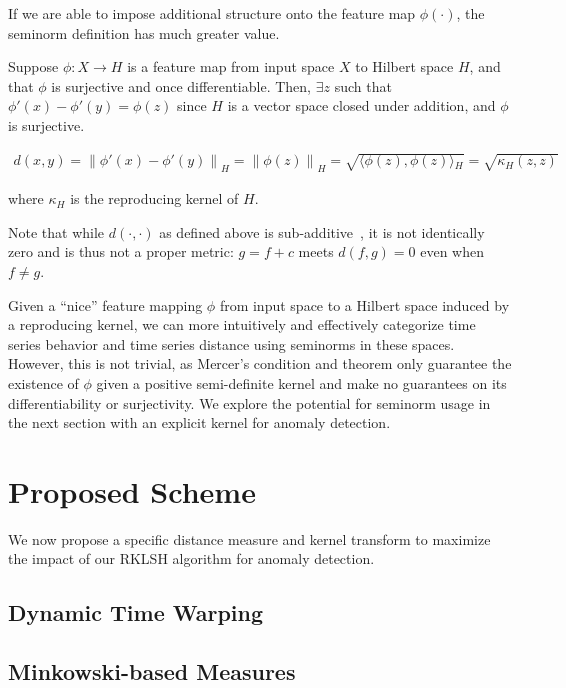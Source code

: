 \documentclass[a4paper]{article}
\newcommand{\norm}[1]{\left\lVert#1\right\rVert}
\newcommand{\innerproduct}[2]{\langle{}#1,#2\rangle{}}
\theoremstyle{def}
\theoremstyle{thm}
\begin{document}
If we are able to impose additional structure onto the feature map $\phi(\cdot)$, the seminorm definition has much greater value.

Suppose $\phi \colon X \rightarrow H$ is a feature map from input space $X$ to Hilbert space $H$, and that $\phi$ is surjective and once differentiable.
Then, $\exists z$ such that $\phi'(x) - \phi'(y) = \phi(z)$ since $H$ is a vector space closed under addition, and $\phi$ is surjective.

\begin{align}
    d(x,y) = \norm{\phi'(x) - \phi'(y)}_H = \norm{\phi(z)}_H = \sqrt{\innerproduct{\phi(z)}{\phi(z)}_H} = \sqrt{\kappa_H(z,z)}
\end{align}

where $\kappa_H$ is the reproducing kernel of $H$.

Note that while $d(\cdot,\cdot)$ as defined above is sub-additive~\cite{rosenlicht68-realanalysis}, it is not identically zero and is thus not a proper metric: $g = f + c$ meets $d(f,g) = 0$ even when $f \neq g$.

Given a ``nice'' feature mapping $\phi$ from input space to a Hilbert space induced by a reproducing kernel, we can more intuitively and effectively categorize time series behavior and time series distance using seminorms in these spaces.
However, this is not trivial, as Mercer's condition and theorem only guarantee the existence of $\phi$ given a positive semi-definite kernel and make no guarantees on its differentiability or surjectivity.
We explore the potential for seminorm usage in the next section with an explicit kernel for anomaly detection.

\section{Proposed Scheme}
\label{sec:proposed_scheme}

We now propose a specific distance measure and kernel transform to maximize the impact of our RKLSH algorithm for anomaly detection.

\subsection{Dynamic Time Warping}


\subsection{Minkowski-based Measures}
\end{document}
